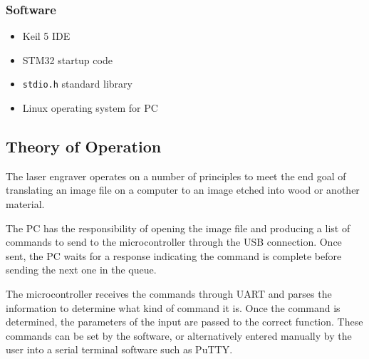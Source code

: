 \documentclass[11pt]{LaTeX-Classes/math-hw}
\begin{document}
\subsubsection*{Software}
\begin{itemize}
  \item Keil 5 IDE
  \item STM32 startup code
  \item \texttt{stdio.h} standard library
  \item Linux operating system for PC
\end{itemize}

\subsection{Theory of Operation}
The laser engraver operates on a number of principles to meet the end goal of
translating an image file on a computer to an image etched into wood or another material.

The PC has the responsibility of opening the image file and producing a list of commands to send to the microcontroller through the
USB connection. Once sent, the PC waits for a response indicating the command is complete
before sending the next one in the queue.

The microcontroller receives the commands through UART and parses the information to determine
what kind of command it is.  Once the command is determined, the parameters of the input are passed to the correct function.
These commands can be set by the software, or alternatively entered manually by the user
into a serial terminal software such as PuTTY.
\end{document}
